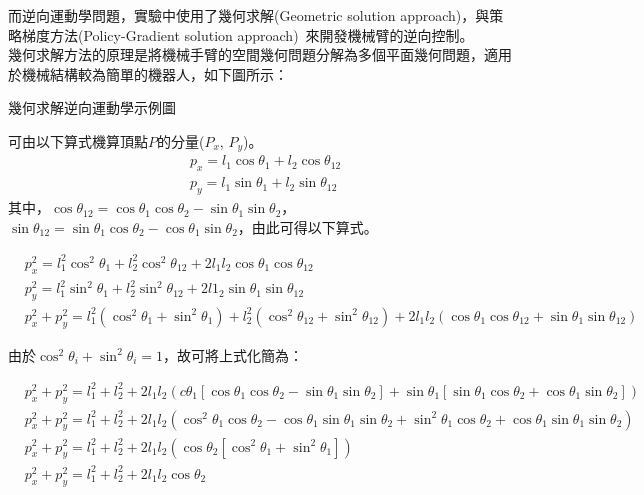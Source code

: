 \documentclass[class=NCU_thesis, crop=false]{standalone}
\begin{document}
而逆向運動學問題，實驗中使用了幾何求解(Geometric solution approach)，與策略梯度方法(Policy-Gradient solution approach)~\cite{dauce2010inverse}來開發機械臂的逆向控制。\\

幾何求解方法的原理是將機械手臂的空間幾何問題分解為多個平面幾何問題，適用於機械結構較為簡單的機器人，如下圖所示：

幾何求解逆向運動學示例圖

可由以下算式機算頂點$P$的分量($P_{x}$, $P_{y}$)。
$$
\begin{aligned}
& p_{x}=l_1 \cos \theta_1+l_2 \cos \theta_{12} \\
& p_{y}=l_1 \sin \theta_1+l_2 \sin \theta_{12}
\end{aligned}
$$
其中，$\cos \theta_{12}=\cos \theta_{1} \cos \theta_{2}-\sin \theta_{1} \sin \theta_{2}$，$
\sin \theta_{12}=\sin \theta_{1} \cos \theta_{2}-\cos \theta_{1} \sin \theta_{2}$，由此可得以下算式。

$$
\begin{aligned}
& p_{x}^2=l_1^2 \cos^2 \theta_1+l_2^2 \cos^2 \theta_{12}+2 l_1 l_2 \cos \theta_1 \cos \theta_{12} \\
& p_{y}^2=l_1^2 \sin^2 \theta_1 + l_2^2 \sin^2 \theta_{12}+2 l1_2 \sin \theta_1 \sin \theta_{12} \\
& p_{x}^2+p_{y}^2=l_1^2\left(\cos^2 \theta_1+\sin^2 \theta_1\right)+l_2^2\left(\cos^2 \theta_{12}+\sin^2 \theta_{12}\right)+2l_1 l_2\left(\cos \theta_1 \cos \theta_{12}+\sin \theta_1 \sin \theta_{12}\right)
\end{aligned}
$$

由於$\cos^2 \theta_{i}+\sin^2 \theta_{i}=1$，故可將上式化簡為：

$$
\begin{aligned}
& p_{x}^2+p_{y}^2=l_1^2+l_2^2+2l_1 l_2\left(c \theta_1\left[\cos \theta_1 \cos \theta_2-\sin \theta_1 \sin \theta_2\right]+\sin \theta_1\left[\sin \theta_1 \cos \theta_2+\cos \theta_1 \sin \theta_2\right]\right) \\
& p_{x}^2+p_y^2=l_1^2+l_2^2+2l_1 l_2\left(\cos^2 \theta_1 \cos \theta_2-\cos \theta_1 \sin \theta_1 \sin \theta_2+\sin^2 \theta_1 \cos \theta_2+\cos \theta_1 \sin \theta_1 \sin \theta_2\right) \\
& p_{x}^2+p_y^2=l_1^2+l_2^2+2l_1 l_2\left(\cos \theta_2\left[\cos^2 \theta_1+\sin^2 \theta_1\right]\right) \\
& p_{x}^2+p_{y}^2=l_1^2+l_2^2+2l_1 l_2 \cos \theta_2
\end{aligned}
$$
\end{document}
